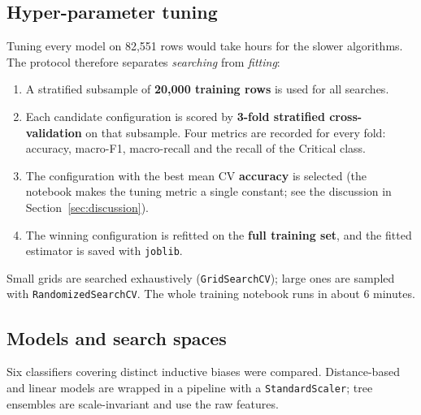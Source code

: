 \documentclass[11pt,a4paper]{article}
\newcommand{\code}[1]{\texttt{\textcolor{codegrey}{#1}}}
\begin{document}
\subsection{Hyper-parameter tuning}

Tuning every model on 82{,}551 rows would take hours for the slower algorithms. The protocol
therefore separates \emph{searching} from \emph{fitting}:

\begin{enumerate}[itemsep=2pt]
  \item A stratified subsample of \textbf{20{,}000 training rows} is used for all searches.
  \item Each candidate configuration is scored by \textbf{3-fold stratified cross-validation}
        on that subsample. Four metrics are recorded for every fold: accuracy, macro-F1,
        macro-recall and the recall of the Critical class.
  \item The configuration with the best mean CV \textbf{accuracy} is selected
        (the notebook makes the tuning metric a single constant; see the discussion in
        Section~\ref{sec:discussion}).
  \item The winning configuration is refitted on the \textbf{full training set}, and the
        fitted estimator is saved with \code{joblib}.
\end{enumerate}

Small grids are searched exhaustively (\code{GridSearchCV}); large ones are sampled with
\code{RandomizedSearchCV}. The whole training notebook runs in about 6 minutes.

\subsection{Models and search spaces}

Six classifiers covering distinct inductive biases were compared. Distance-based and linear
models are wrapped in a pipeline with a \code{StandardScaler}; tree ensembles are scale-invariant
and use the raw features.
\end{document}
